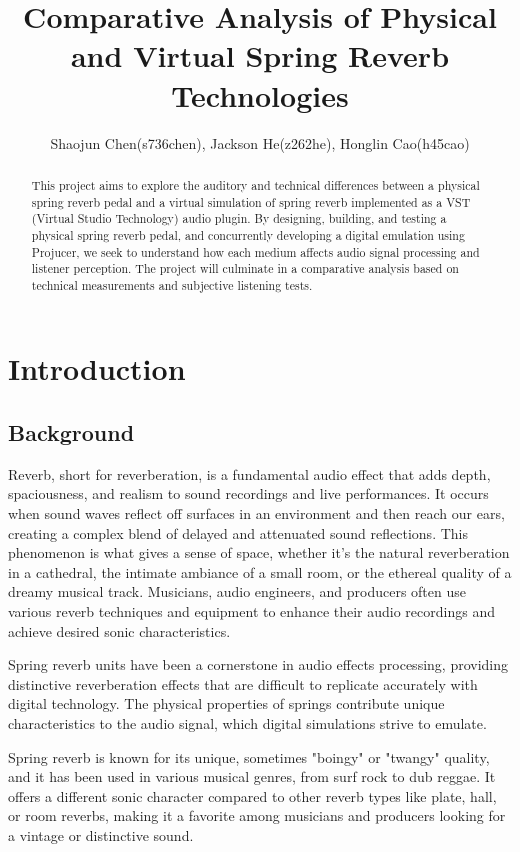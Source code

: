 \documentclass[12pt]{article}
\title{Comparative Analysis of Physical and Virtual Spring Reverb Technologies}
\author{
    Shaojun Chen(s736chen), Jackson He(z262he), Honglin Cao(h45cao) \\
}
\date{\displaydate{date}}
\begin{document}
\maketitle

\begin{abstract}
This project aims to explore the auditory and technical differences between a physical spring reverb pedal and a virtual simulation of spring reverb implemented as a VST (Virtual Studio Technology) audio plugin. By designing, building, and testing a physical spring reverb pedal, and concurrently developing a digital emulation using Projucer, we seek to understand how each medium affects audio signal processing and listener perception. The project will culminate in a comparative analysis based on technical measurements and subjective listening tests.
\end{abstract}

\tableofcontents
\newpage

\section{Introduction}
\subsection{Background}

Reverb, short for reverberation, is a fundamental audio effect that adds depth, spaciousness, and realism to sound recordings and live performances. It occurs when sound waves reflect off surfaces in an environment and then reach our ears, creating a complex blend of delayed and attenuated sound reflections. This phenomenon is what gives a sense of space, whether it's the natural reverberation in a cathedral, the intimate ambiance of a small room, or the ethereal quality of a dreamy musical track. Musicians, audio engineers, and producers often use various reverb techniques and equipment to enhance their audio recordings and achieve desired sonic characteristics.

Spring reverb units have been a cornerstone in audio effects processing, providing distinctive reverberation effects that are difficult to replicate accurately with digital technology. The physical properties of springs contribute unique characteristics to the audio signal, which digital simulations strive to emulate.

Spring reverb is known for its unique, sometimes "boingy" or "twangy" quality, and it has been used in various musical genres, from surf rock to dub reggae. It offers a different sonic character compared to other reverb types like plate, hall, or room reverbs, making it a favorite among musicians and producers looking for a vintage or distinctive sound.
\end{document}
